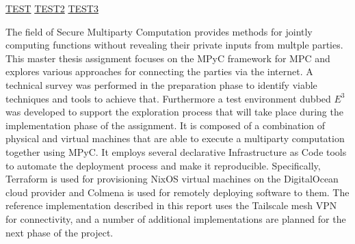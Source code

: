 \begin{frame}
\href{prep/01-introduction.md\#background}{TEST}
\protect\hyperlink{background}{TEST2}
\href{prep/./01-introduction.md\#background}{TEST3}

The field of Secure Multiparty Computation provides methods for jointly
computing functions without revealing their private inputs from multple
parties. This master thesis assignment focuses on the MPyC framework for
MPC and explores various approaches for connecting the parties via the
internet. A technical survey was performed in the preparation phase to
identify viable techniques and tools to achieve that. Furthermore a test
environment dubbed \(E^3\) was developed to support the exploration
process that will take place during the implementation phase of the
assignment. It is composed of a combination of physical and virtual
machines that are able to execute a multiparty computation together
using MPyC. It employs several declarative Infrastructure as Code tools
to automate the deployment process and make it reproducible.
Specifically, Terraform is used for provisioning NixOS virtual machines
on the DigitalOcean cloud provider and Colmena is used for remotely
deploying software to them. The reference implementation described in
this report uses the Tailscale mesh VPN for connectivity, and a number
of additional implementations are planned for the next phase of the
project.
\end{frame}

